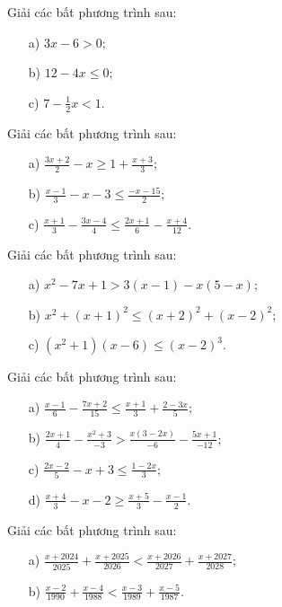 \documentclass[%
    fontsize=12pt,%
    chapterprefix=false,%
    open=right,%
    twoside=false,%
    numbers=noenddot,%
    headings=optiontohead,%
    final,%
    DIV=15,%
    parskip=half %
]{scrbook}
\begin{document}
\begin{tuluan}

\item Giải các bất phương trình sau:
\begin{enumerate}[label=\alph*)]
  \item[a)] $3x - 6 > 0;$
  \item[b)] $12 - 4x \leq 0;$
  \item[c)] $7 - \frac{1}{2}x < 1.$
\end{enumerate}

\item Giải các bất phương trình sau:
\begin{enumerate}[label=\alph*)]
  \item[a)] $\frac{3x + 2}{2} - x \geq 1 + \frac{x + 3}{3};$
  \item[b)] $\frac{x - 1}{3} - x - 3 \leq \frac{-x - 15}{2};$
  \item[c)] $\frac{x + 1}{3} - \frac{3x - 4}{4} \leq \frac{2x + 1}{6} - \frac{x + 4}{12}.$
\end{enumerate}

\item Giải các bất phương trình sau:
\begin{enumerate}[label=\alph*)]
  \item[a)] $x^2 - 7x + 1 > 3(x - 1) - x(5 - x);$
  \item[b)] $x^2 + (x + 1)^2 \leq (x + 2)^2 + (x - 2)^2;$
  \item[c)] $(x^2 + 1)(x - 6) \leq (x - 2)^3.$
\end{enumerate}

\item Giải các bất phương trình sau:
\begin{enumerate}[label=\alph*)]
  \item[a)] $\frac{x - 1}{6} - \frac{7x + 2}{15} \leq \frac{x + 1}{3} + \frac{2 - 3x}{5};$
  \item[b)] $\frac{2x + 1}{4} - \frac{x^2 + 3}{-3} > \frac{x(3 - 2x)}{-6} - \frac{5x + 1}{-12};$
  \item[c)] $\frac{2x - 2}{5} - x + 3 \leq \frac{1 - 2x}{3};$
  \item[d)] $\frac{x + 4}{3} - x - 2 \geq \frac{x + 5}{3} - \frac{x - 1}{2}.$
\end{enumerate}

\item Giải các bất phương trình sau:
\begin{enumerate}[label=\alph*)]
  \item[a)] $\frac{x + 2024}{2025} + \frac{x + 2025}{2026} < \frac{x + 2026}{2027} + \frac{x + 2027}{2028};$
  \item[b)] $\frac{x - 2}{1990} + \frac{x - 4}{1988} < \frac{x - 3}{1989} + \frac{x - 5}{1987}.$
\end{enumerate}


\end{tuluan}
\end{document}
